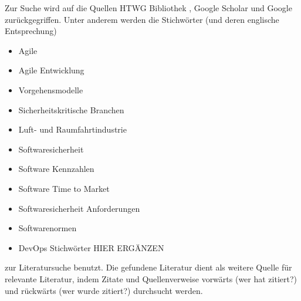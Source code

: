 Zur Suche wird auf die Quellen HTWG Bibliothek \parencite[vgl.][]{HTWG2015aa}, Google Scholar \parencite[vgl.][]{Google2015aa} und Google \parencite[vgl.][]{Google2015ab} zurückgegriffen.
Unter anderem werden die Stichwörter (und deren englische Entsprechung)
\begin{itemize}
\item Agile
\item Agile Entwicklung
\item Vorgehensmodelle
\item Sicherheitskritische Branchen
\item Luft- und Raumfahrtindustrie
\item Softwaresicherheit
\item Software Kennzahlen
\item Software Time to Market
\item Softwaresicherheit Anforderungen
\item Softwarenormen
\item DevOps Stichwörter HIER ERGÄNZEN
\end{itemize}
zur Literatursuche benutzt.
Die gefundene Literatur dient als weitere Quelle für relevante Literatur, indem Zitate und Quellenverweise vorwärts (wer hat zitiert?) und rückwärts (wer wurde zitiert?) durchsucht werden.
